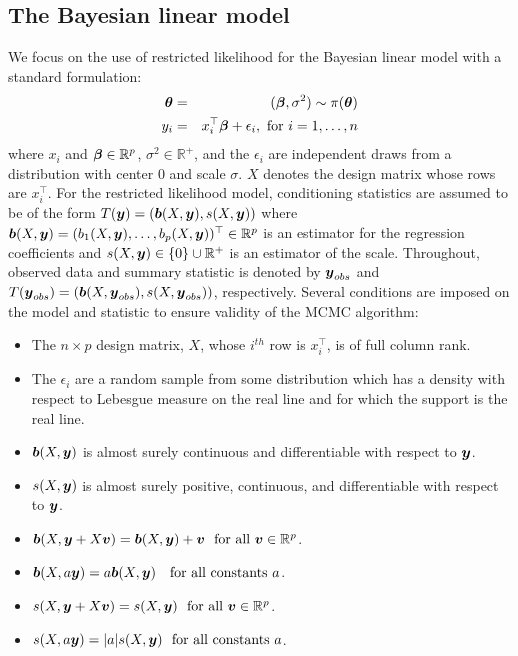 \documentclass[ba]{imsart}
\makeatletter
\def\bth{\mbox{\boldmath $\theta$}}
\def\bbeta{\mbox{\boldmath $\beta$}}
\newcommand{\by}{\mbox{\boldmath $y$}}
\newcommand{\bv}{\mbox{\boldmath $v$}}
\newcommand{\bb}{\mbox{\boldmath $b$}}
\newcommand{\green}[1]{{\color{green}#1}}
\newcommand{\labitem}[2]{%
\def\@itemlabel{\textbf{#1}{.}}
\item
\def\@currentlabel{#1}\label{#2}}
\makeatother
\begin{document}
\subsection{The Bayesian linear model}
We focus on the use of restricted likelihood for the Bayesian linear
model with a standard formulation: 
\begin{eqnarray}
\label{LinearModel}
\bth&=&(\bbeta,\sigma^2) \sim  \pi(\bth) 
\nonumber\\
y_i  & =  & x_i^\top \bbeta + \epsilon_i , \mbox{ for } i = 1, \ldots, n 
\end{eqnarray}
where $x_i$ and $\bbeta \in \mathbb{R}^p$, $\sigma^2 \in \mathbb{R}^+$, 
and the $\epsilon_i$ are independent draws from a distribution with center $0$ and scale $\sigma$. $X$ denotes the design matrix whose rows are  $x_i^\top$. For the restricted likelihood model,  conditioning statistics are assumed to be of the form $T(\by) = (\bb(X, \by), s(X, \by))$ where $\bb(X, \by)= (b_1(X,\by), \dots,b_p(X,\by))^\top\in \mathbb R^{p}$ is an estimator for the regression coefficients and $s(X, \by)\in \{0\} \cup {\mathbb R}^+$ is an estimator of the scale. Throughout, observed data and summary statistic is denoted by $\by_{obs}$ and $T(\by_{obs})=(\bb(X, \by_{obs}), s(X, \by_{obs}))$, respectively. 
Several conditions are imposed on the model and statistic to ensure validity of the MCMC algorithm:
\begin{itemize}
\labitem{C1}{fullRank} The $n \times p$ design matrix, $X$, whose $i^{th}$ row is $x_i^\top$, 
is of full column rank.  
\labitem{C2}{supReal} The $\epsilon_i$ are a random sample from some distribution which has a density with 
respect to Lebesgue measure on the real line and for which the support is the real line.  
\labitem{C3}{asb}$\bb(X,\by)$ is almost surely continuous and differentiable with respect to $\by$.  
\labitem{C4}{as} $s(X,\by)$ is almost surely positive, continuous, and differentiable with respect to $\by$.  
\labitem{C5}{regEq} $\bb(X,\by+X\bv)=\bb(X,\by)+\bv \ \ \text{for  all}\ \bv\in\mathbb{R}^p$. 
\labitem{C6}{scaleEqReg} $\bb(X,a\by)=a\bb(X,\by)\ \ \ \text{for all constants } a$.  
\labitem{C7}{regIn} $s(X,\by+X\bv)=s(X,\by) \ \ \text{for all}\ \bv\in\mathbb{R}^p$.  
\labitem{C8}{scaleEq2Reg} $s(X, a\by)=|a|s(X,\by) \ \ \text{for all constants } a$.  
\end{itemize}
\end{document}
